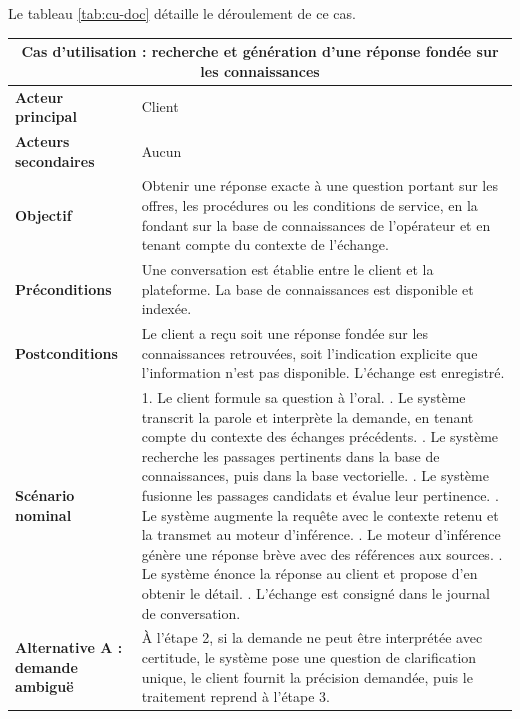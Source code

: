 Le tableau \ref{tab:cu-doc} détaille le déroulement de ce cas.

\begin{table}[H]
\centering
\renewcommand{\arraystretch}{1.25}
\begin{tabular}{|p{3.0cm}|p{11.5cm}|}
\hline
\multicolumn{2}{|c|}{\textbf{Cas d'utilisation : recherche et génération d'une réponse fondée sur les connaissances}} \\
\hline
\textbf{Acteur principal} & Client \\
\hline
\textbf{Acteurs secondaires} & Aucun \\
\hline
\textbf{Objectif} & Obtenir une réponse exacte à une question portant sur les offres, les procédures ou les conditions de service, en la fondant sur la base de connaissances de l'opérateur et en tenant compte du contexte de l'échange. \\
\hline
\textbf{Préconditions} & Une conversation est établie entre le client et la plateforme. La base de connaissances est disponible et indexée. \\
\hline
\textbf{Postconditions} & Le client a reçu soit une réponse fondée sur les connaissances retrouvées, soit l'indication explicite que l'information n'est pas disponible. L'échange est enregistré. \\
\hline
\textbf{Scénario nominal} &
1. Le client formule sa question à l'oral. \newline
2. Le système transcrit la parole et interprète la demande, en tenant compte du contexte des échanges précédents. \newline
3. Le système recherche les passages pertinents dans la base de connaissances, puis dans la base vectorielle. \newline
4. Le système fusionne les passages candidats et évalue leur pertinence. \newline
5. Le système augmente la requête avec le contexte retenu et la transmet au moteur d'inférence. \newline
6. Le moteur d'inférence génère une réponse brève avec des références aux sources. \newline
7. Le système énonce la réponse au client et propose d'en obtenir le détail. \newline
8. L'échange est consigné dans le journal de conversation. \\
\hline
\textbf{Alternative A : demande ambiguë} & À l'étape 2, si la demande ne peut être interprétée avec certitude, le système pose une question de clarification unique, le client fournit la précision demandée, puis le traitement reprend à l'étape 3. \\

\end{tabular}
\end{table}
